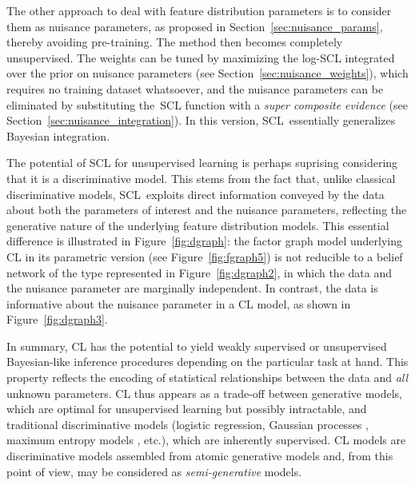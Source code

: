 \documentclass[english]{scrartcl}
\begin{document}

The other approach to deal with feature distribution parameters is to consider them as nuisance parameters, as proposed in Section~\ref{sec:nuisance_params}, thereby avoiding pre-training. The method then becomes completely unsupervised. The weights can be tuned by maximizing the log-SCL integrated over the prior on nuisance parameters (see Section~\ref{sec:nuisance_weights}), which requires no training dataset whatsoever, and the nuisance parameters can be eliminated by substituting the~SCL function with a {\em super composite evidence} (see Section~\ref{sec:nuisance_integration}). In this version, SCL~essentially generalizes Bayesian integration. 

The potential of SCL for unsupervised learning is perhaps suprising considering that it is a discriminative model. This stems from the fact that, unlike classical discriminative models, SCL~exploits direct information conveyed by the data about both the parameters of interest and the nuisance parameters, reflecting the generative nature of the underlying feature distribution models. This essential difference is illustrated in Figure~\ref{fig:dgraph}: the factor graph model underlying CL in its parametric version (see Figure~\ref{fig:fgraph5}) is not reducible to a belief network of the type represented in Figure~\ref{fig:dgraph2}, in which the data and the nuisance parameter are marginally independent. In contrast, the data is informative about the nuisance parameter in a CL model, as shown in Figure~\ref{fig:dgraph3}.


In summary, CL has the potential to yield weakly supervised or unsupervised Bayesian-like inference procedures depending on the particular task at hand. This property reflects the encoding of statistical relationships between the data and {\em all} unknown parameters. CL thus appears as a trade-off between generative models, which are optimal for unsupervised learning but possibly intractable, and traditional discriminative models (logistic regression, Gaussian processes \cite{Rasmussen-06}, maximum entropy models \cite{BergerA-96}, etc.), which are inherently supervised. CL models are discriminative models assembled from atomic generative models and, from this point of view, may be considered as {\em semi-generative} models.



\end{document}
